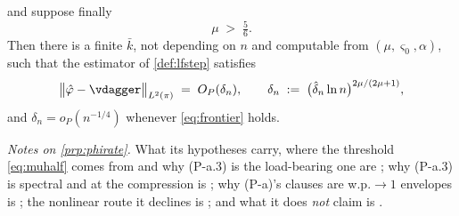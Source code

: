 \begin{proposition}
\begin{enumerate}
\end{enumerate}
and suppose finally
\begin{equation}\label{eq:muhalf}
\mu\;>\;\tfrac56 .
\end{equation}
Then there is a finite $\bar k$, not depending on $n$ and computable from $(\mu,\varsigma_0,\alpha)$,
such that the estimator of \cref{def:lfstep} satisfies
\begin{equation}\label{eq:phirate}
\big\|\hat\varphi-\vdagger\big\|_{L^{2}(\pi)}\;=\;O_P(\delta_n),
\qquad
\delta_n\;:=\;\big(\hat\delta_n\ln n\big)^{2\mu/(2\mu+1)} ,
\end{equation}
and $\delta_n=o_P(n^{-1/4})$ whenever \eqref{eq:frontier} holds.
\end{proposition}

\noindent\emph{Notes on \cref{prp:phirate}.} What its hypotheses carry, where the threshold
\eqref{eq:muhalf} comes from and why (P-a.3) is the load-bearing one are ; why
(P-a.3) is spectral and at the compression is ; why (P-a)'s clauses are
w.p.$\to1$ envelopes is ; the nonlinear route it declines is
; and what it does \emph{not} claim is .

